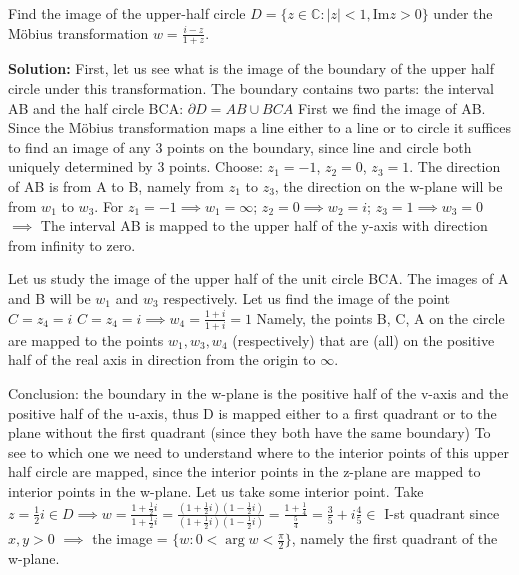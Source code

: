 \documentclass[12pt]{article}
\newcommand{\Ima}{\text{Im}}
\begin{document}
\begin{example}
Find the image of the upper-half circle $D = \{z \in \mathbb{C}: |z| < 1, \Ima z > 0\}$ under the Möbius transformation $w = \frac{i-z}{1+z}$.

\textbf{Solution:} First, let us see what is the image of the boundary of the upper half circle under this transformation.
The boundary contains two parts: the interval AB and the half circle BCA: $\partial D = AB \cup BCA$
First we find the image of AB.
Since the Möbius transformation maps a line either to a line or to circle it suffices to find an image of any 3 points on the boundary, since line and circle both uniquely determined by 3 points. Choose: $z_1 = -1$, $z_2 = 0$, $z_3 = 1$.
The direction of AB is from A to B, namely from $z_1$ to $z_3$, the direction on the w-plane will be from $w_1$ to $w_3$.
For $z_1 = -1 \implies w_1 = \infty$; $z_2 = 0 \implies w_2 = i$; $z_3 = 1 \implies w_3 = 0$
$\implies$ The interval AB is mapped to the upper half of the y-axis with direction from infinity to zero.

Let us study the image of the upper half of the unit circle BCA. The images of A and B will be $w_1$ and $w_3$ respectively. Let us find the image of the point $C = z_4 = i$
$C = z_4 = i \implies w_4 = \frac{1+i}{1+i} = 1$
Namely, the points B, C, A on the circle are mapped to the points $w_1, w_3, w_4$ (respectively) that are (all) on the positive half of the real axis in direction from the origin to $\infty$.

Conclusion: the boundary in the w-plane is the positive half of the v-axis and the positive half of the u-axis, thus D is mapped either to a first quadrant or to the plane without the first quadrant (since they both have the same boundary) To see to which one we need to understand where to the interior points of this upper half circle are mapped, since the interior points in the z-plane are mapped to interior points in the w-plane. Let us take some interior point.
Take $z = \frac{1}{2}i \in D \implies w = \frac{1+\frac{1}{2}i}{1+\frac{1}{2}i} = \frac{(1+\frac{1}{2}i)(1-\frac{1}{2}i)}{(1+\frac{1}{2}i)(1-\frac{1}{2}i)} = \frac{1+\frac{1}{4}}{\frac{5}{4}} = \frac{3}{5} + i\frac{4}{5} \in$ I-st quadrant since $x,y > 0$
$\implies$ the image = $\{w: 0 < \arg w < \frac{\pi}{2}\}$, namely the first quadrant of the w-plane.
\end{example}
\end{document}
